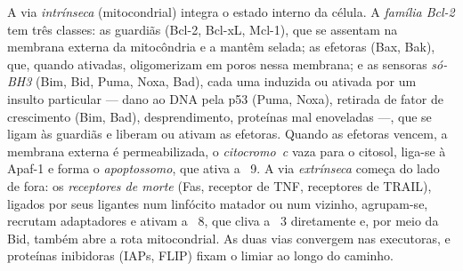 \begin{definition}\label{def:b3:cell-cycle-apoptosis:pathways}
A via \emph{intrínseca} (mitocondrial) integra o estado interno da
célula. A \emph{família Bcl-2} tem três classes: as guardiãs (Bcl-2,
Bcl-xL, Mcl-1), que se assentam na membrana externa da mitocôndria e a
mantêm selada; as efetoras (Bax, Bak), que, quando ativadas,
oligomerizam em poros nessa membrana; e as sensoras \emph{só-BH3} (Bim,
Bid, Puma, Noxa, Bad), cada uma induzida ou ativada por um insulto
particular --- dano ao DNA pela p53 (Puma, Noxa), retirada de fator de
crescimento (Bim, Bad), desprendimento, proteínas mal enoveladas ---,
que se ligam às guardiãs e liberam ou ativam as efetoras. Quando as
efetoras vencem, a membrana externa é permeabilizada, o
\emph{citocromo~c} vaza para o citosol, liga-se à Apaf-1 e forma o
\emph{apoptossomo}, que ativa a ~9. A via \emph{extrínseca}
começa do lado de fora: os \emph{receptores de morte} (Fas, receptor de
TNF, receptores de TRAIL), ligados por seus ligantes num linfócito
matador ou num vizinho, agrupam-se, recrutam adaptadores e ativam a
~8, que cliva a ~3 diretamente e, por meio da Bid, também
abre a rota mitocondrial. As duas vias convergem nas 
executoras, e proteínas inibidoras (IAPs, FLIP) fixam o limiar ao longo
do caminho.
\end{definition}

